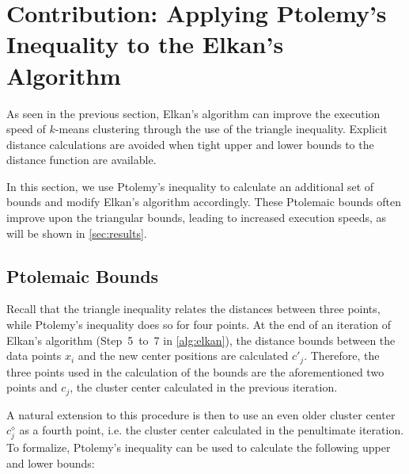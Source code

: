 \newcommand{\prev}{\diamond}

\section{Contribution: Applying Ptolemy's Inequality to the Elkan's Algorithm}
\label{sec:contrib}

As seen in the previous section,
Elkan's algorithm can improve the execution speed of $k$-means clustering through the use of the triangle inequality.
Explicit distance calculations are avoided when tight upper and lower bounds to the distance function are available.

In this section, we use Ptolemy's inequality to calculate an additional set of bounds and modify Elkan's algorithm accordingly.
These Ptolemaic bounds often improve upon the triangular bounds, leading to increased execution speeds, as will be shown in \autoref{sec:results}.


\subsection{Ptolemaic Bounds}
Recall that the triangle inequality relates the distances between three points,
while Ptolemy's inequality does so for four points.
At the end of an iteration of Elkan's algorithm (Step~5~to~7 in \autoref{alg:elkan}),
the distance bounds between the data points $x_i$ and the new center positions are calculated $c'_j$.
Therefore, the three points used in the calculation of the bounds are the aforementioned two points and $c_j$, the cluster center calculated in the previous iteration.

A natural extension to this procedure is then to use an even older cluster center $c^\prev_j$ as a fourth point,
i.e. the cluster center calculated in the penultimate iteration.
To formalize, Ptolemy's inequality can be used to calculate the following upper and lower bounds:

